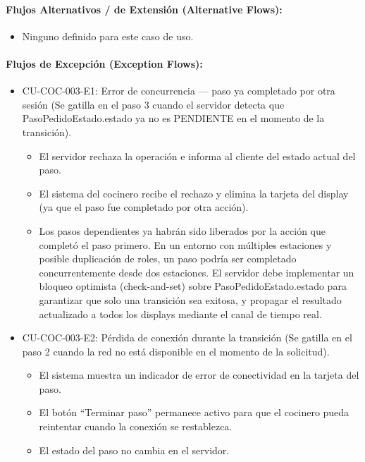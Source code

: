 \paragraph{Flujos Alternativos / de Extensión (Alternative Flows):}
\begin{itemize}
    \item Ninguno definido para este caso de uso.
\end{itemize}

\paragraph{Flujos de Excepción (Exception Flows):}
\begin{itemize}
    \item CU-COC-003-E1: Error de concurrencia --- paso ya completado por otra sesión (Se gatilla en el paso 3 cuando el servidor detecta que PasoPedidoEstado.estado ya no es PENDIENTE en el momento de la transición).
    \begin{itemize}
        \item El servidor rechaza la operación e informa al cliente del estado actual del paso.
        \item El sistema del cocinero recibe el rechazo y elimina la tarjeta del display (ya que el paso fue completado por otra acción).
        \item Los pasos dependientes ya habrán sido liberados por la acción que completó el paso primero. En un entorno con múltiples estaciones y posible duplicación de roles, un paso podría ser completado concurrentemente desde dos estaciones. El servidor debe implementar un bloqueo optimista (check-and-set) sobre PasoPedidoEstado.estado para garantizar que solo una transición sea exitosa, y propagar el resultado actualizado a todos los displays mediante el canal de tiempo real.
    \end{itemize}
    \item CU-COC-003-E2: Pérdida de conexión durante la transición (Se gatilla en el paso 2 cuando la red no está disponible en el momento de la solicitud).
    \begin{itemize}
        \item El sistema muestra un indicador de error de conectividad en la tarjeta del paso.
        \item El botón ``Terminar paso'' permanece activo para que el cocinero pueda reintentar cuando la conexión se restablezca.
        \item El estado del paso no cambia en el servidor.
    \end{itemize}
\end{itemize}

